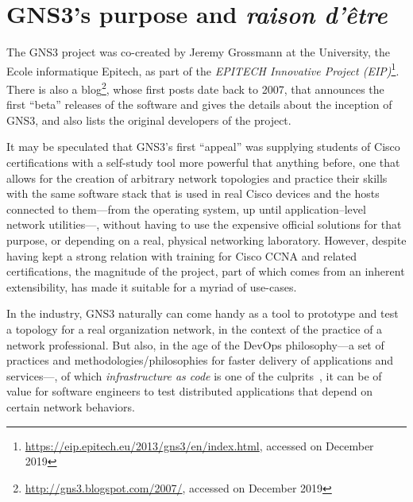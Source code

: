 \section{GNS3's purpose and \emph{raison d'être}}
\label{sec:gns3why}

The GNS3 project was co-created by Jeremy Grossmann at the University, the Ecole informatique Epitech, as part of the \emph{EPITECH Innovative Project (EIP)}\footnote{\url{https://eip.epitech.eu/2013/gns3/en/index.html}, accessed on December 2019}.
There is also a blog\footnote{\url{http://gns3.blogspot.com/2007/}, accessed on December 2019}, whose first posts date back to 2007, that announces the first ``beta'' releases of the software and gives the details about the inception of GNS3, and also lists the original developers of the project.

It may be speculated that GNS3's first ``appeal'' was supplying students of Cisco certifications with a self-study tool more powerful that anything before, one that allows for the creation of arbitrary network topologies and practice their skills with the same software stack that is used in real Cisco devices and the hosts connected to them---from the operating system, up until application--level network utilities---, without having to use the expensive official solutions for that purpose, or depending on a real, physical networking laboratory.
However, despite having kept a strong relation with training for Cisco CCNA and related certifications, the magnitude of the project, part of which comes from an inherent extensibility, has made it suitable for a myriad of use-cases.

In the industry, GNS3 naturally can come handy as a tool to prototype and test a topology for a real organization network, in the context of the practice of a network professional.
But also, in the age of the DevOps philosophy---a set of practices and methodologies/philosophies for faster delivery of applications and services---, of which \emph{infrastructure as code} is one of the culprits~\cite{awswhatisdevops}, it can be of value for software engineers to test distributed applications that depend on certain network behaviors. %

